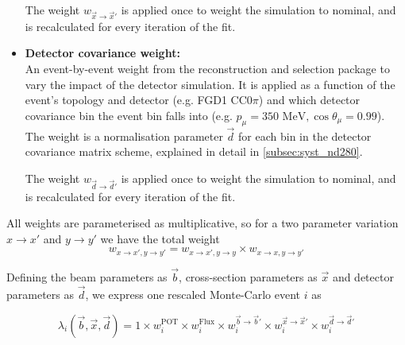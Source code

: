 \begin{itemize}
	The weight $w_{\vec{x}\rightarrow \vec{x}'}$ is applied once to weight the simulation to nominal, and is recalculated for every iteration of the fit.
	
	\item \textbf{Detector covariance weight:} \\
	An event-by-event weight from the reconstruction and selection package to vary the impact of the detector simulation. It is applied as a function of the event's topology and detector (e.g. FGD1 CC0$\pi$) and which detector covariance bin the event bin falls into (e.g. $p_\mu=350\text{ MeV}, \cos\theta_\mu=0.99$). The weight is a normalisation parameter $\vec{d}$ for each bin in the detector covariance matrix scheme, explained in detail in \autoref{subsec:syst_nd280}.
	
	The weight $w_{\vec{d}\rightarrow \vec{d}'}$ is applied once to weight the simulation to nominal, and is recalculated for every iteration of the fit.
\end{itemize}

All weights are parameterised as multiplicative, so for a two parameter variation $x \rightarrow x'$ and $y \rightarrow y'$ we have the total weight 
\begin{equation}
w_{x \rightarrow x', y \rightarrow y'} = w_{x \rightarrow x', y \rightarrow y} \times w_{x \rightarrow x, y\rightarrow y'}
\end{equation}

Defining the beam parameters as $\vec{b}$, cross-section parameters as $\vec{x}$ and detector parameters as $\vec{d}$, we express one rescaled Monte-Carlo event $i$ as

\begin{equation}
\lambda_i\left(\vec{b}, \vec{x}, \vec{d}\right) = 1 \times w_i^\text{POT} \times w_i^\text{Flux} \times w^{\vec{b}\rightarrow \vec{b}'}_i \times w^{\vec{x} \rightarrow \vec{x}'}_i \times w^{\vec{d}\rightarrow \vec{d}'}_i
\label{eq:mc_scale}
\end{equation}

